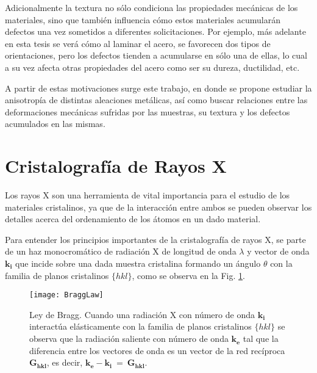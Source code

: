 Adicionalmente la textura no sólo condiciona las propiedades mecánicas de los materiales, sino que también influencia cómo estos materiales acumularán defectos una vez sometidos a diferentes solicitaciones. 
Por ejemplo, más adelante en esta tesis se verá cómo al laminar el acero, se favorecen dos tipos de orientaciones, pero los defectos tienden a acumularse en sólo una de ellas, lo cual a su vez afecta otras propiedades del acero como ser su dureza, ductilidad, etc.

A partir de estas motivaciones surge este trabajo, en donde se propone estudiar la anisotropía de distintas aleaciones metálicas, así como buscar relaciones entre las deformaciones mecánicas sufridas por las muestras, su textura y los defectos acumulados en las mismas.

\section{Cristalografía de Rayos X}\label{S:DRX}
Los rayos X son una herramienta de vital importancia para el estudio de los materiales cristalinos, ya que de la interacción entre ambos se pueden observar los detalles acerca del ordenamiento de los átomos en un dado material.

Para entender los principios importantes de la cristalografía de rayos X, se parte de un haz monocromático de radiación X de longitud de onda $\lambda$ y vector de onda $\mathbf{k_i}$ que incide sobre una dada muestra cristalina formando un ángulo $\theta$ con la familia de planos cristalinos $\{hkl\}$, como se observa en la Fig. \ref{fig:Bragg}.

\begin{figure}[htb!]
  \centering
  \texttt{[image: BraggLaw]}
  \caption{Ley de Bragg. Cuando una radiación X con número de onda $\mathbf{k_i}$ interactúa elásticamente con la familia de planos cristalinos $\{hkl\}$ se observa que la radiación saliente con número de onda $\mathbf{k_e}$ tal que la diferencia entre los vectores de onda es un vector de la red recíproca $\mathbf{G_{hkl}}$, es decir, $\mathbf{k_e} - \mathbf{k_i} \ = \ \mathbf{G_{hkl}}$.}
  \label{fig:Bragg}
\end{figure}


